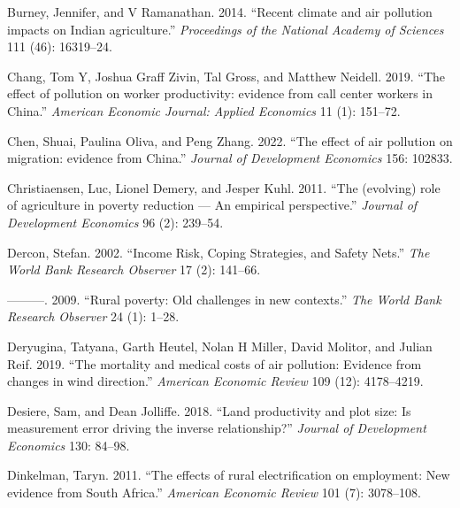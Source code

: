\documentclass[
]{article}
\newlength{\cslhangindent}
\newlength{\cslentryspacingunit} %
\newenvironment{CSLReferences}[2] %
 {%
  \setlength{\parindent}{0pt}
  \ifodd #1
  \let\oldpar\par
  \def\par{\hangindent=\cslhangindent\oldpar}
  \fi
  \setlength{\parskip}{#2\cslentryspacingunit}
 }%
 {}
\begin{document}
\begin{CSLReferences}{1}{0}
\leavevmode{}%
Burney, Jennifer, and V Ramanathan. 2014. {``{Recent climate and air pollution impacts on Indian agriculture}.''} \emph{{Proceedings of the National Academy of Sciences}} 111 (46): 16319--24.

\leavevmode{}%
Chang, Tom Y, Joshua Graff Zivin, Tal Gross, and Matthew Neidell. 2019. {``{The effect of pollution on worker productivity: evidence from call center workers in China}.''} \emph{{American Economic Journal: Applied Economics}} 11 (1): 151--72.

\leavevmode{}%
Chen, Shuai, Paulina Oliva, and Peng Zhang. 2022. {``{The effect of air pollution on migration: evidence from China}.''} \emph{{Journal of Development Economics}} 156: 102833.

\leavevmode{}%
Christiaensen, Luc, Lionel Demery, and Jesper Kuhl. 2011. {``{The (evolving) role of agriculture in poverty reduction --- An empirical perspective}.''} \emph{{Journal of Development Economics}} 96 (2): 239--54.

\leavevmode{}%
Dercon, Stefan. 2002. {``Income Risk, Coping Strategies, and Safety Nets.''} \emph{{The World Bank Research Observer}} 17 (2): 141--66.

\leavevmode{}%
---------. 2009. {``{Rural poverty: Old challenges in new contexts}.''} \emph{{The World Bank Research Observer}} 24 (1): 1--28.

\leavevmode{}%
Deryugina, Tatyana, Garth Heutel, Nolan H Miller, David Molitor, and Julian Reif. 2019. {``{The mortality and medical costs of air pollution: Evidence from changes in wind direction}.''} \emph{{American Economic Review}} 109 (12): 4178--4219.

\leavevmode{}%
Desiere, Sam, and Dean Jolliffe. 2018. {``{Land productivity and plot size: Is measurement error driving the inverse relationship?}''} \emph{{Journal of Development Economics}} 130: 84--98.

\leavevmode{}%
Dinkelman, Taryn. 2011. {``{The effects of rural electrification on employment: New evidence from South Africa}.''} \emph{{American Economic Review}} 101 (7): 3078--108.


\end{CSLReferences}
\end{document}
